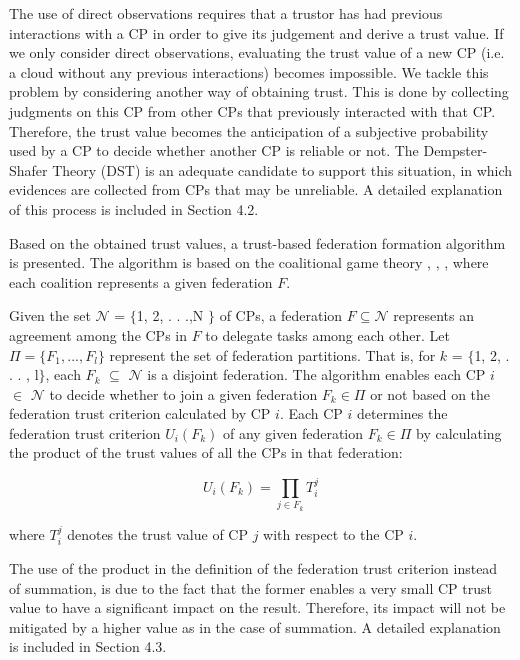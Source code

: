 \documentclass[preprint]{elsarticle}
\theoremstyle{definition}
\theoremstyle{remark}
\theoremstyle{property}
\begin{document}
The use of direct observations requires that a trustor has had previous interactions with a CP in order to give its judgement and derive a trust value. If we only consider direct observations, evaluating the trust value of a new CP (i.e. a cloud without any previous interactions) becomes impossible. We tackle this problem by considering another way of obtaining trust. This is done by collecting judgments on this CP from other CPs that previously interacted with that CP. Therefore, the trust value becomes the anticipation of a subjective probability used by a CP to decide whether
another CP is reliable or not. The Dempster-Shafer Theory (DST) \cite{yu2002evidential} is an adequate candidate to support this situation, in which evidences are collected from CPs that may be unreliable. A detailed explanation of this process is included in Section 4.2.

Based on the obtained trust values, a trust-based federation formation algorithm is presented. The algorithm is based on the coalitional game theory \cite{ray2007game}, \cite{dreze1980hedonic}, \cite{apt2009generic}, where each coalition represents a given federation $F$.

Given the set $\mathcal{N}$ = $\{$1, 2, . . .,N $\}$ of CPs, a federation $F \subseteq \mathcal{N}$ represents an
agreement among the CPs in $F$ to delegate tasks among each other. Let $\Pi = \{F_{1}, . .. , F_{l}\}$ represent the set of federation partitions. That is, for $k$ = $\{$1, 2, . . . , l$\}$, each $F_{k}$ $\subseteq$ $\mathcal{N}$ is a disjoint federation. The algorithm enables each CP $i$ $\in$ $\mathcal{N}$ to decide whether to join a given federation $F_{k} \in \Pi$ or not based on the federation trust criterion calculated by CP $i$. Each CP $i$ determines the federation trust criterion $U_{i}(F_{k})$ of any given federation $F_{k} \in \Pi$ by calculating the product of the trust values of all the CPs in that federation:

\begin{equation}
U_{i}(F_{k}) = \prod _{{j}\in F_{k}} T_{i}^{j}
\end{equation}

where $T_{i}^{j}$ denotes the trust value of CP $j$ with respect to the CP $i$.

The use of the product in the definition of the federation trust criterion instead of summation, is due to the fact that the former enables a very small CP trust value to have a significant impact on the result. Therefore, its impact will not be mitigated by a higher value as in the case of summation. A detailed explanation is included in Section 4.3.
\end{document}
